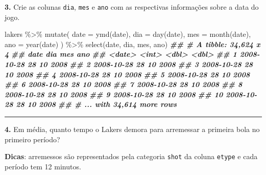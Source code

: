 \documentclass[
]{book}
\newenvironment{Shaded}{\begin{snugshade}}{\end{snugshade}}
\newcommand{\AttributeTok}[1]{\textcolor[rgb]{0.77,0.63,0.00}{#1}}
\newcommand{\DocumentationTok}[1]{\textcolor[rgb]{0.56,0.35,0.01}{\textbf{\textit{#1}}}}
\newcommand{\FunctionTok}[1]{\textcolor[rgb]{0.00,0.00,0.00}{#1}}
\newcommand{\NormalTok}[1]{#1}
\newcommand{\SpecialCharTok}[1]{\textcolor[rgb]{0.00,0.00,0.00}{#1}}
\begin{document}
\textbf{3.} Crie as colunas \texttt{dia}, \texttt{mes} e \texttt{ano} com as respectivas informações sobre a data do jogo.

\begin{Shaded}
\begin{Highlighting}[]
\NormalTok{lakers }\SpecialCharTok{\%\textgreater{}\%}
  \FunctionTok{mutate}\NormalTok{(}
    \AttributeTok{date =} \FunctionTok{ymd}\NormalTok{(date),}
    \AttributeTok{dia =} \FunctionTok{day}\NormalTok{(date),}
    \AttributeTok{mes =} \FunctionTok{month}\NormalTok{(date),}
    \AttributeTok{ano =} \FunctionTok{year}\NormalTok{(date)}
\NormalTok{  ) }\SpecialCharTok{\%\textgreater{}\%} 
  \FunctionTok{select}\NormalTok{(date, dia, mes, ano)}
\DocumentationTok{\#\# \# A tibble: 34,624 x 4}
\DocumentationTok{\#\#    date         dia   mes   ano}
\DocumentationTok{\#\#    \textless{}date\textgreater{}     \textless{}int\textgreater{} \textless{}dbl\textgreater{} \textless{}dbl\textgreater{}}
\DocumentationTok{\#\#  1 2008{-}10{-}28    28    10  2008}
\DocumentationTok{\#\#  2 2008{-}10{-}28    28    10  2008}
\DocumentationTok{\#\#  3 2008{-}10{-}28    28    10  2008}
\DocumentationTok{\#\#  4 2008{-}10{-}28    28    10  2008}
\DocumentationTok{\#\#  5 2008{-}10{-}28    28    10  2008}
\DocumentationTok{\#\#  6 2008{-}10{-}28    28    10  2008}
\DocumentationTok{\#\#  7 2008{-}10{-}28    28    10  2008}
\DocumentationTok{\#\#  8 2008{-}10{-}28    28    10  2008}
\DocumentationTok{\#\#  9 2008{-}10{-}28    28    10  2008}
\DocumentationTok{\#\# 10 2008{-}10{-}28    28    10  2008}
\DocumentationTok{\#\# \# ... with 34,614 more rows}
\end{Highlighting}
\end{Shaded}

\begin{center}\rule{0.5\linewidth}{0.5pt}\end{center}

\textbf{4.} Em média, quanto tempo o Lakers demora para arremessar a primeira bola no primeiro período?

\textbf{Dicas}: arremessos são representados pela categoria \texttt{shot} da coluna \texttt{etype} e cada período tem 12 minutos.
\end{document}
